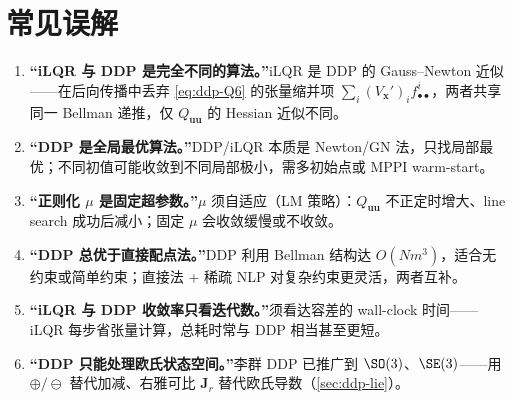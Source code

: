 \section*{常见误解}
\begin{enumerate}
  \item \textbf{“iLQR 与 DDP 是完全不同的算法。”}\;iLQR 是 DDP 的 Gauss--Newton 近似——在后向传播中丢弃 \cref{eq:ddp-Q6} 的张量缩并项 $\sum_i(V_{\mathbf{x}}')_i f^i_{\bullet\bullet}$，两者共享同一 Bellman 递推，仅 $Q_{\mathbf{uu}}$ 的 Hessian 近似不同。
  \item \textbf{“DDP 是全局最优算法。”}\;DDP/iLQR 本质是 Newton/GN 法，只找局部最优；不同初值可能收敛到不同局部极小，需多初始点或 MPPI warm-start。
  \item \textbf{“正则化 $\mu$ 是固定超参数。”}\;$\mu$ 须自适应（LM 策略）：$Q_{\mathbf{uu}}$ 不正定时增大、line search 成功后减小；固定 $\mu$ 会收敛缓慢或不收敛。
  \item \textbf{“DDP 总优于直接配点法。”}\;DDP 利用 Bellman 结构达 $O(Nm^3)$，适合无约束或简单约束；直接法 + 稀疏 NLP 对复杂约束更灵活，两者互补。
  \item \textbf{“iLQR 与 DDP 收敛率只看迭代数。”}\;须看达容差的 wall-clock 时间——iLQR 每步省张量计算，总耗时常与 DDP 相当甚至更短。
  \item \textbf{“DDP 只能处理欧氏状态空间。”}\;李群 DDP 已推广到 $\SO(3)$、$\SE(3)$——用 $\oplus/\ominus$ 替代加减、右雅可比 $\mathbf{J}_r$ 替代欧氏导数（\cref{sec:ddp-lie}）。
\end{enumerate}

